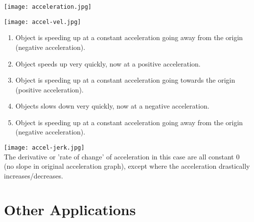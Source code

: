 \documentclass[12pt,fleqn]{book} %
\begin{document}
\begin{multicols}{2}
    \texttt{[image: acceleration.jpg]} \\
    \begin{center}

        \texttt{[image: accel-vel.jpg]}
        \begin{enumerate}[label=(\alph*)]
            \item Object is speeding up at a constant acceleration going away from the origin (negative acceleration).
            \item Object speeds up very quickly, now at a positive acceleration.
            \item Object is speeding up at a constant acceleration going towards the origin (positive acceleration).
            \item Objects slows down very quickly, now at a negative acceleration.
            \item Object is speeding up at a constant acceleration going away from the origin (negative acceleration).
        \end{enumerate}

    \end{center}
    \columnbreak

    \hspace*{-20mm}

    \begin{center}
        \vspace*{10mm}
        \texttt{[image: accel-jerk.jpg]} \\
        The derivative or 'rate of change' of acceleration in this case are all constant 0 (no slope in original acceleration graph), except where the acceleration drastically increases/decreases.

    \end{center}
\end{multicols}

\pagebreak


\section{Other Applications}

\begin{center}

\end{center}

\vspace*{-3mm}

\pagebreak

\begin{center}

\end{center}
\end{document}

